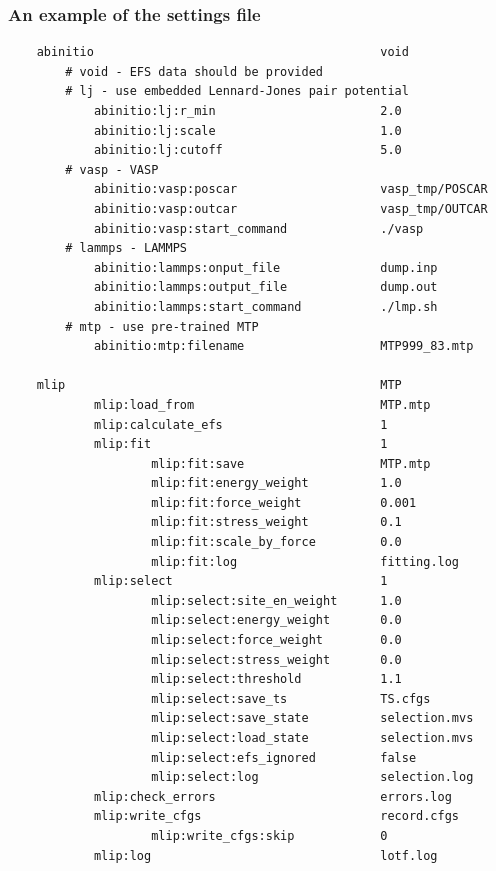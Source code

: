 \documentclass[12pt]{article}
\renewcommand{\_}{\char`_}
\begin{document}
\subsubsection*{An example of the settings file}
{\small
	\begin{verbatim}
    abinitio                                        void
	    # void - EFS data should be provided									
	    # lj - use embedded Lennard-Jones pair potential 					
	        abinitio:lj:r_min                       2.0						
	        abinitio:lj:scale                       1.0					
	        abinitio:lj:cutoff                      5.0						
	    # vasp - VASP															
	        abinitio:vasp:poscar                    vasp_tmp/POSCAR		
	        abinitio:vasp:outcar                    vasp_tmp/OUTCAR			
	        abinitio:vasp:start_command             ./vasp					 
	    # lammps - LAMMPS														
	        abinitio:lammps:onput_file              dump.inp				
	        abinitio:lammps:output_file             dump.out				
	        abinitio:lammps:start_command           ./lmp.sh				
	    # mtp - use pre-trained MTP											
	        abinitio:mtp:filename                   MTP999_83.mtp		
	
	mlip                                            MTP
			mlip:load_from							MTP.mtp					
	        mlip:calculate_efs                      1						
	        mlip:fit                                1					
	                mlip:fit:save                   MTP.mtp					
	                mlip:fit:energy_weight          1.0						
	                mlip:fit:force_weight           0.001					
	                mlip:fit:stress_weight          0.1						
	                mlip:fit:scale_by_force         0.0						
	                mlip:fit:log                    fitting.log				
	        mlip:select                             1						
	                mlip:select:site_en_weight      1.0						
	                mlip:select:energy_weight       0.0						
	                mlip:select:force_weight        0.0						
	                mlip:select:stress_weight       0.0						
	                mlip:select:threshold           1.1						
	                mlip:select:save_ts             TS.cfgs					
	                mlip:select:save_state          selection.mvs		
	                mlip:select:load_state          selection.mvs	
	                mlip:select:efs_ignored         false
	                mlip:select:log                 selection.log			
	        mlip:check_errors                       errors.log				
	        mlip:write_cfgs                         record.cfgs			
	                mlip:write_cfgs:skip            0					
	        mlip:log                                lotf.log				
	

\end{verbatim}}
\end{document}
